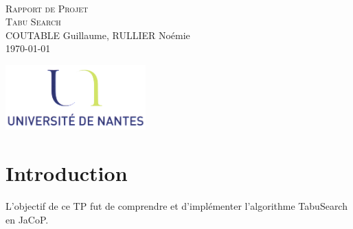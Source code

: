 \documentclass[a4paper,10pt]{article}
\begin{document}
\fancyhead[LE,CE,RE,LO,CO,RO]{}
\fancyfoot[LE,CE,RE,LO,CO,RO]{}
\renewcommand{\headrulewidth}{0.4pt}
\renewcommand{\footrulewidth}{0.4pt}

\begin{titlepage}

\vspace*{\fill}~
\begin{center}
{\large \textsc{Rapport de Projet}} \\
\textsc{Tabu Search} \\
\vspace{0.5cm}
COUTABLE Guillaume, RULLIER Noémie \\
\today
\end{center}
\vspace*{\fill}

\begin{center}
\noindent 
\includegraphics[height=2.5cm]{Images/universite.png}
\end{center}
\pagebreak
\end{titlepage}

\newpage
\tableofcontents  

\newpage
\pagestyle{fancy}

\section{Introduction}
L'objectif de ce TP fut de comprendre et d'implémenter l'algorithme TabuSearch en JaCoP.

\end{document}
